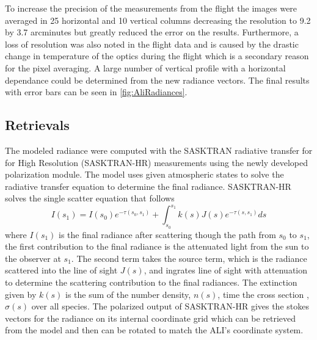 \documentclass[12pt]{article}
\begin{document}
To increase the precision of the measurements from the flight the images were averaged in 25 horizontal and 10 vertical columns decreasing the resolution to 9.2 by 3.7 arcminutes but greatly reduced the error on the results. Furthermore, a loss of resolution was also noted in the flight data and is caused by the drastic change in temperature of the optics during the flight which is a secondary reason for the pixel averaging. A large number of vertical profile with a horizontal dependance could be determined from the new radiance vectors. The final results with error bars can be seen in \autoref{fig:AliRadiances}.

\subsection{Retrievals}

The modeled radiance were computed with the SASKTRAN radiative transfer for for High Resolution (SASKTRAN-HR) measurements using the newly developed polarization module. The model uses given atmospheric states to solve the radiative transfer equation to determine the final radiance. SASKTRAN-HR solves the single scatter equation that follows \begin{equation}
    I(s_{1}) = I(s_{0})e^{-\tau(s_{0}, s_{1})}+\int^{s_{1}}_{s_{0}}k(s)J(s)e^{-\tau(s, s_{1})}ds
\end{equation}
where $I(s_{1})$ is the final radiance after scattering though the path from $s_{0}$ to $s_{1}$, the first contribution to the final radiance is the attenuated light from the sun to the observer at $s_{1}$. The second term takes the source term, which is the radiance scattered into the line of sight $J(s)$, and ingrates line of sight with attenuation to determine the scattering contribution to the final radiances. The extinction given by $k(s)$ is the sum of the number density, $n(s)$, time the cross section , $\sigma(s)$ over all species. The polarized output of SASKTRAN-HR gives the stokes vectors for the radiance on its internal coordinate grid which can be retrieved from the model and then can be rotated to match the ALI's coordinate system.
\end{document}
